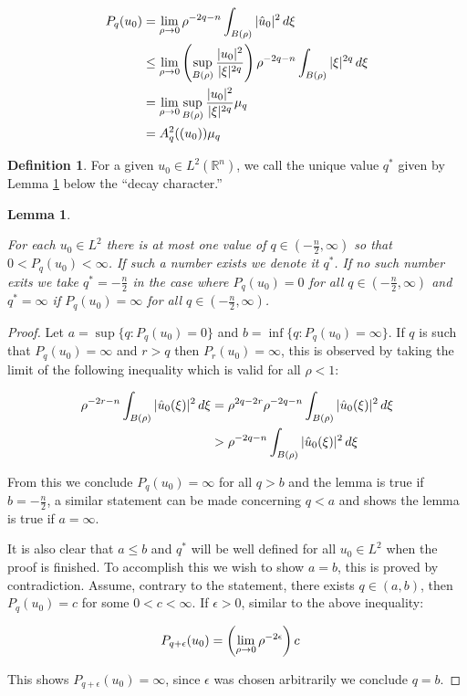 \documentclass{amsart}
\numberwithin{Theorem}{section}
\numberwithin{equation}{section}
\newtheorem {Lemma}[Theorem]  {Lemma}
\theoremstyle{definition}
\newtheorem{Definition}[Theorem]{Definition}
\theoremstyle{remark}
\begin{document}
\begin{align}
P_q(u_0)&= \lim_{\rho\rightarrow 0}\rho^{-2q-n}\int_{B(\rho)}|\hat{u}_0|^2\,d\xi\notag\\
&\leq \lim_{\rho\rightarrow 0} \left(\sup_{B(\rho)}\frac{|u_0|^2}{|\xi|^{2q}}\right)\rho^{-2q-n}\int_{B(\rho)}|\xi|^{2q}\,d\xi\notag\\
&=\lim_{\rho\rightarrow 0} \sup_{B(\rho)}\frac{|u_0|^2}{|\xi|^{2q}}\mu_q\notag\\
&=A^2_{q}((u_0))\mu_q\notag
\end{align}

\begin{Definition}

For a given $u_0\in L^2(\mathbb{R}^n)$, we call the unique value $q^*$ given by Lemma \ref{lemma:qstar} below  the ``decay character.''

\end{Definition}

\begin{Lemma}\label{lemma:qstar}

For each $u_0\in L^2$ there is at most one value of $q\in (-\frac{n}{2},\infty)$ so that $0<P_q(u_0)<\infty$.  If such a number exists we denote it $q^*$.  If no such number exits we take $q^*=-\frac{n}{2}$ in the case where $P_q(u_0)=0$ for all $q\in (-\frac{n}{2},\infty)$ and $q^*=\infty$ if $P_q(u_0)=\infty$ for all $q\in (-\frac{n}{2},\infty)$.

\end{Lemma}

\begin{proof}

Let $a = \sup\{q: P_q(u_0)=0\}$ and $b = \inf \{q: P_q(u_0)=\infty\}$.  If $q$ is such that $P_q(u_0)=\infty$ and $r>q$ then $P_r(u_0)=\infty$, this is observed by taking the limit of the following inequality which is valid for all $\rho<1$:

\begin{align}
\rho^{-2r-n}\int_{B(\rho)}|\hat{u}_0(\xi)|^2\, d\xi &= \rho^{2q-2r}\rho^{-2q-n}\int_{B(\rho)}|\hat{u}_0(\xi)|^2\, d\xi\\
&>\rho^{-2q-n}\int_{B(\rho)}|\hat{u}_0(\xi)|^2\, d\xi\notag
\end{align}

From this we conclude $P_q(u_0)=\infty$ for all $q>b$ and the lemma is true if $b=-\frac{n}{2}$, a similar statement can be made concerning $q<a$ and shows the lemma is true if $a=\infty$.

It is also clear that $a\leq b$ and $q^*$ will be well defined for all $u_0\in L^2$ when the proof is finished.  To accomplish this we wish to show $a=b$, this is proved by contradiction.  Assume, contrary to the statement, there exists $q\in(a,b)$, then $P_q(u_0)=c$ for some $0<c<\infty$.  If $\epsilon>0$, similar to the above inequality:

\begin{align}
P_{q+\epsilon}(u_0) &= \left(\lim_{\rho\rightarrow 0}\rho^{-2\epsilon}\right)c\notag
\end{align}

This shows $P_{q+\epsilon}(u_0)=\infty$, since $\epsilon$ was chosen arbitrarily we conclude $q=b$.

\end{proof}
\end{document}
